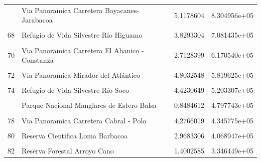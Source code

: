 \documentclass[10pt,landscape,a3paper]{article}
\begin{document}
\begin{longtable}[t]{llrr}
\addlinespace
66 & Via Panoramica Carretera Bayacanes-Jarabacoa & 5.1178604 & 8.304956e+05\\
\cellcolor{lightgray}{67} & \cellcolor{lightgray}{Monumento Natural Diego de Ocampo} & \cellcolor{lightgray}{3.1409661} & \cellcolor{lightgray}{7.960324e+05}\\
68 & Refugio de Vida Silvestre Río Higuamo & 3.8293304 & 7.081435e+05\\
\cellcolor{lightgray}{69} & \cellcolor{lightgray}{Refugio de Vida Silvestre Humedales del Bajo Yaque del Sur} & \cellcolor{lightgray}{1.1086223} & \cellcolor{lightgray}{6.481264e+05}\\
70 & Via Panoramica Carretera El Abanico - Constanza & 2.7128399 & 6.170540e+05\\
\addlinespace
\cellcolor{lightgray}{71} & \cellcolor{lightgray}{Refugio de Vida Silvestre Bahia de Luperón} & \cellcolor{lightgray}{3.2791403} & \cellcolor{lightgray}{6.126976e+05}\\
72 & Via Panoramica Mirador del Atlántico & 4.8032548 & 5.819625e+05\\
\cellcolor{lightgray}{73} & \cellcolor{lightgray}{Monumento Natural Saltos de Jima} & \cellcolor{lightgray}{2.9440900} & \cellcolor{lightgray}{5.465493e+05}\\
74 & Refugio de Vida Silvestre Río Soco & 4.4230649 & 5.203307e+05\\
\cellcolor{lightgray}{75} & \cellcolor{lightgray}{Monumento Natural Cabo Samaná} & \cellcolor{lightgray}{5.3621004} & \cellcolor{lightgray}{4.970983e+05}\\
\addlinespace
76 & Parque Nacional Manglares de Estero Balsa & 0.8484612 & 4.797743e+05\\
\cellcolor{lightgray}{77} & \cellcolor{lightgray}{Reserva Cientifica Loma Guaconejo} & \cellcolor{lightgray}{1.8671873} & \cellcolor{lightgray}{4.363857e+05}\\
78 & Via Panoramica Carretera Cabral - Polo & 4.2766019 & 4.345775e+05\\
\cellcolor{lightgray}{79} & \cellcolor{lightgray}{Reserva Cientifica Ébano Verde} & \cellcolor{lightgray}{1.3922027} & \cellcolor{lightgray}{4.162576e+05}\\
80 & Reserva Cientifica Loma Barbacoa & 2.9683306 & 4.068947e+05\\
\addlinespace
\cellcolor{lightgray}{81} & \cellcolor{lightgray}{Monumento Natural Salto de La Damajagua} & \cellcolor{lightgray}{6.9006781} & \cellcolor{lightgray}{3.813125e+05}\\
82 & Reserva Forestal Arroyo Cano & 1.4002585 & 3.346449e+05\\

\end{longtable}
\end{document}
